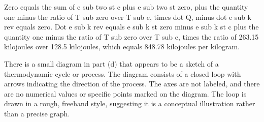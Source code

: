 Zero equals the sum of e sub two st c plus e sub two st zero, plus the quantity one minus the ratio of T sub zero over T sub e, times dot Q, minus dot e sub k rev equals zero. Dot e sub k rev equals e sub k st zero minus e sub k st c plus the quantity one minus the ratio of T sub zero over T sub e, times the ratio of 263.15 kilojoules over 128.5 kilojoules, which equals 848.78 kilojoules per kilogram.

There is a small diagram in part (d) that appears to be a sketch of a thermodynamic cycle or process. The diagram consists of a closed loop with arrows indicating the direction of the process. The axes are not labeled, and there are no numerical values or specific points marked on the diagram. The loop is drawn in a rough, freehand style, suggesting it is a conceptual illustration rather than a precise graph.